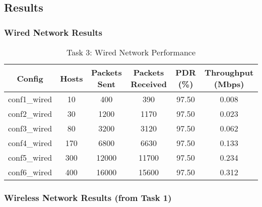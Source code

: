 \documentclass{article}
\begin{document}
\subsection{Results}

\subsubsection{Wired Network Results}

\begin{table}[H]

\centering

\caption{Task 3: Wired Network Performance}

\begin{tabular}{|c|c|c|c|c|c|}

\hline

Config & Hosts & Packets Sent & Packets Received & PDR (\%) & Throughput (Mbps) \\

\hline

conf1\_wired & 10 & 400 & 390 & 97.50 & 0.008 \\

conf2\_wired & 30 & 1200 & 1170 & 97.50 & 0.023 \\

conf3\_wired & 80 & 3200 & 3120 & 97.50 & 0.062 \\

conf4\_wired & 170 & 6800 & 6630 & 97.50 & 0.133 \\

conf5\_wired & 300 & 12000 & 11700 & 97.50 & 0.234 \\

conf6\_wired & 400 & 16000 & 15600 & 97.50 & 0.312 \\

\hline

\end{tabular}

\end{table}

\subsubsection{Wireless Network Results (from Task 1)}
\end{document}
